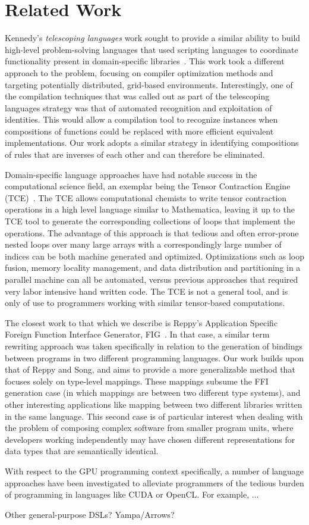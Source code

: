 
\section{Related Work}

Kennedy's \emph{telescoping languages} work sought to provide a similar
ability to build high-level problem-solving languages that used scripting
languages to coordinate functionality present in domain-specific
libraries~\cite{kennedy00telescoping}. This work took a different approach to
the problem, focusing on compiler optimization methods and targeting
potentially distributed, grid-based environments. Interestingly, one of the
compilation techniques that was called out as part of the telescoping
languages strategy was that of automated recognition and exploitation of
identities. This would allow a compilation tool to recognize instances when
compositions of functions could be replaced with more efficient equivalent
implementations. Our work adopts a similar strategy in identifying
compositions of rules that are inverses of each other and can therefore be
eliminated.

Domain-specific language approaches have had notable success in the
computational science field, an exemplar being the Tensor Contraction Engine
(TCE)~\cite{baumgartner05synthesis}. The TCE allows computational chemists to
write tensor contraction operations in a high level language similar to
Mathematica, leaving it up to the TCE tool to generate the corresponding
collections of loops that implement the operations. The advantage of this
approach is that tedious and often error-prone nested loops over many large
arrays with a correspondingly large number of indices can be both machine
generated and optimized. Optimizations such as loop fusion, memory locality
management, and data distribution and partitioning in a parallel machine can
all be automated, versus previous approaches that required very labor
intensive hand written code. The TCE is not a general tool, and is only of use
to programmers working with similar tensor-based computations.

The closest work to that which we describe is Reppy's Application Specific
Foreign Function Interface Generator, FIG~\cite{reppy06fig}. In that case, a
similar term rewriting approach was taken specifically in relation to the
generation of bindings between programs in two different programming
languages. Our work builds upon that of Reppy and Song, and aims to provide a
more generalizable method that focuses solely on type-level mappings. These
mappings subsume the FFI generation case (in which mappings are between two
different type systems), and other interesting applications like mapping
between two different libraries written in the same language. This second case
is of particular interest when dealing with the problem of composing complex
software from smaller program units, where developers working independently
may have chosen different representations for data types that are semantically
identical.

With respect to the GPU programming context specifically, a number of language
approaches have been investigated to alleviate programmers of the tedious
burden of programming in languages like CUDA or OpenCL. For example, ...

Other general-purpose DSLs? Yampa/Arrows?
